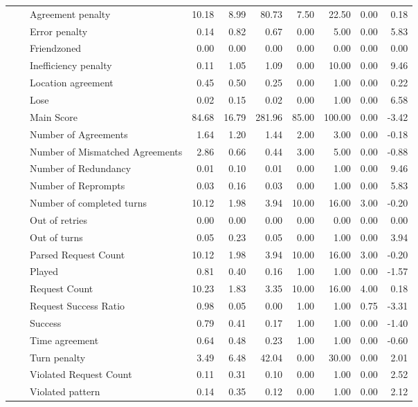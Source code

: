 \begin{tabular}{lllrrrrrrr}
 &  & Agreement penalty & 10.18 & 8.99 & 80.73 & 7.50 & 22.50 & 0.00 & 0.18 \\
 &  & Error penalty & 0.14 & 0.82 & 0.67 & 0.00 & 5.00 & 0.00 & 5.83 \\
 &  & Friendzoned & 0.00 & 0.00 & 0.00 & 0.00 & 0.00 & 0.00 & 0.00 \\
 &  & Inefficiency penalty & 0.11 & 1.05 & 1.09 & 0.00 & 10.00 & 0.00 & 9.46 \\
 &  & Location agreement & 0.45 & 0.50 & 0.25 & 0.00 & 1.00 & 0.00 & 0.22 \\
 &  & Lose & 0.02 & 0.15 & 0.02 & 0.00 & 1.00 & 0.00 & 6.58 \\
 &  & Main Score & 84.68 & 16.79 & 281.96 & 85.00 & 100.00 & 0.00 & -3.42 \\
 &  & Number of Agreements & 1.64 & 1.20 & 1.44 & 2.00 & 3.00 & 0.00 & -0.18 \\
 &  & Number of Mismatched Agreements & 2.86 & 0.66 & 0.44 & 3.00 & 5.00 & 0.00 & -0.88 \\
 &  & Number of Redundancy & 0.01 & 0.10 & 0.01 & 0.00 & 1.00 & 0.00 & 9.46 \\
 &  & Number of Reprompts & 0.03 & 0.16 & 0.03 & 0.00 & 1.00 & 0.00 & 5.83 \\
 &  & Number of completed turns & 10.12 & 1.98 & 3.94 & 10.00 & 16.00 & 3.00 & -0.20 \\
 &  & Out of retries & 0.00 & 0.00 & 0.00 & 0.00 & 0.00 & 0.00 & 0.00 \\
 &  & Out of turns & 0.05 & 0.23 & 0.05 & 0.00 & 1.00 & 0.00 & 3.94 \\
 &  & Parsed Request Count & 10.12 & 1.98 & 3.94 & 10.00 & 16.00 & 3.00 & -0.20 \\
 &  & Played & 0.81 & 0.40 & 0.16 & 1.00 & 1.00 & 0.00 & -1.57 \\
 &  & Request Count & 10.23 & 1.83 & 3.35 & 10.00 & 16.00 & 4.00 & 0.18 \\
 &  & Request Success Ratio & 0.98 & 0.05 & 0.00 & 1.00 & 1.00 & 0.75 & -3.31 \\
 &  & Success & 0.79 & 0.41 & 0.17 & 1.00 & 1.00 & 0.00 & -1.40 \\
 &  & Time agreement & 0.64 & 0.48 & 0.23 & 1.00 & 1.00 & 0.00 & -0.60 \\
 &  & Turn penalty & 3.49 & 6.48 & 42.04 & 0.00 & 30.00 & 0.00 & 2.01 \\
 &  & Violated Request Count & 0.11 & 0.31 & 0.10 & 0.00 & 1.00 & 0.00 & 2.52 \\
 &  & Violated pattern & 0.14 & 0.35 & 0.12 & 0.00 & 1.00 & 0.00 & 2.12 \\

\end{tabular}
